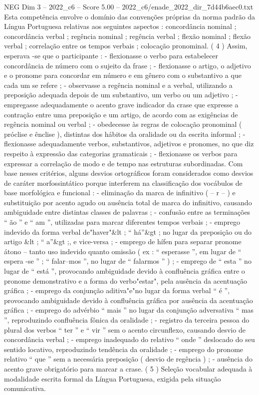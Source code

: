 \begin{textsample}{NEG Dim 3 – 2022\_c6 – Score 5.00 – 2022\_c6/enade\_2022\_dir\_7d44b6aec0.txt}
Esta competência envolve o domínio das convenções próprias da norma padrão da Língua Portuguesa relativas aos seguintes aspectos : concordância nominal ; concordância verbal ; regência nominal ; regência verbal ; flexão nominal ; flexão verbal ; correlação entre os tempos verbais ; colocação pronominal. ( 4 ) Assim, esperava -se que o participante : - flexionasse o verbo para estabelecer concordância de número com o sujeito da frase ; - flexionasse o artigo, o adjetivo e o pronome para concordar em número e em gênero com o substantivo a que cada um se refere ; - observasse a regência nominal e a verbal, utilizando a preposição adequada depois de um substantivo, um verbo ou um adjetivo ; - empregasse adequadamente o acento grave indicador da crase que expresse a contração entre uma preposição e um artigo, de acordo com as exigências de regência nominal ou verbal ; - obedecesse às regras de colocação pronominal ( próclise e ênclise ), distintas dos hábitos da oralidade ou da escrita informal ; - flexionasse adequadamente verbos, substantivos, adjetivos e pronomes, no que diz respeito à expressão das categorias gramaticais ; - flexionasse os verbos para expressar a correlação de modo e de tempo nas estruturas subordinadas.
Com base nesses critérios, alguns desvios ortográficos foram considerados como desvios de caráter morfossintático porque interferem na classificação dos vocábulos de base morfológica e funcional : - eliminação da marca de infinitivo ( – r – ) e substituição por acento agudo ou ausência total de marca do infinitivo, causando ambiguidade entre distintas classes de palavras ; - confusão entre as terminações “ ão ” e “ am ”, utilizadas para marcar diferentes tempos verbais ; - emprego indevido da forma verbal de"haver"\&lt ; “ há”\&gt ; no lugar da preposição ou do artigo \&lt ; “ a”\&gt ;, e vice-versa ; - emprego de hífen para separar pronome átono – tanto uso indevido quanto omissão ( ex : “ esperasse ”, em lugar de “ espera -se ” ; “ falar–mos ”, no lugar de “ falarmos ” ) ; - emprego de “ esta ” no lugar de “ está ”, provocando ambiguidade devido à confluência gráfica entre o pronome demonstrativo e a forma do verbo"estar", pela ausência da acentuação gráfica ; - emprego da conjunção aditiva"e"no lugar da forma verbal “ é ”, provocando ambiguidade devido à confluência gráfica por ausência da acentuação gráfica ; - emprego do advérbio “ mais ” no lugar da conjunção adversativa “ mas ”, reproduzindo confluência fônica da oralidade ; - registro da terceira pessoa do plural dos verbos “ ter ” e “ vir ” sem o acento circunflexo, causando desvio de concordância verbal ; - emprego inadequado do relativo “ onde ” deslocado do seu sentido locativo, reproduzindo tendência da oralidade ; - emprego do pronome relativo “ que ” sem a necessária preposição ( desvio de regência ) ; - ausência do acento grave obrigatório para marcar a crase. ( 5 ) Seleção vocabular adequada à modalidade escrita formal da Língua Portuguesa, exigida pela situação comunicativa.

\end{textsample}
